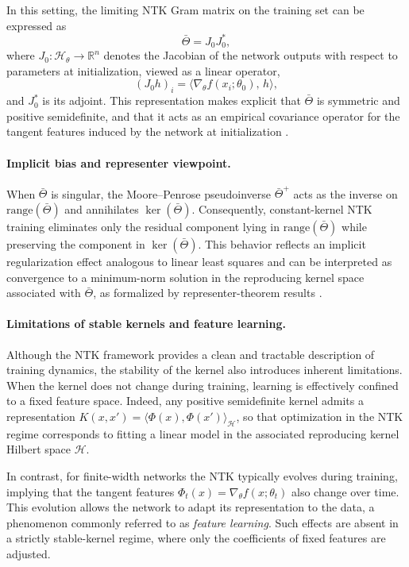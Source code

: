 In this setting, the limiting NTK Gram matrix on the training set can be
expressed as
\begin{equation}
	\bar\Theta = J_0 J_0^\ast,
\end{equation}
where $J_0 : \mathcal{H}_\theta \to \mathbb{R}^n$ denotes the Jacobian of the
network outputs with respect to parameters at initialization, viewed as a
linear operator,
\[
	(J_0 h)_i = \langle \nabla_\theta f(x_i;\theta_0),\,h\rangle,
\]
and $J_0^\ast$ is its adjoint. This representation makes explicit that
$\bar\Theta$ is symmetric and positive semidefinite, and that it acts as an
empirical covariance operator for the tangent features induced by the network
at initialization \citep{jacot2018ntk}.

\paragraph{Implicit bias and representer viewpoint.}
When $\bar\Theta$ is singular, the Moore--Penrose pseudoinverse $\bar\Theta^+$
acts as the inverse on $\mathrm{range}(\bar\Theta)$ and annihilates
$\ker(\bar\Theta)$. Consequently, constant-kernel NTK training eliminates only
the residual component lying in $\mathrm{range}(\bar\Theta)$ while preserving
the component in $\ker(\bar\Theta)$. This behavior reflects an implicit
regularization effect analogous to linear least squares and can be interpreted
as convergence to a minimum-norm solution in the reproducing kernel space
associated with $\bar\Theta$, as formalized by representer-theorem results
\citep{bietti2019inductivebiasneuraltangent,
	bartolucci2021understandingneuralnetworksreproducing}.

\paragraph{Limitations of stable kernels and feature learning.}
Although the NTK framework provides a clean and tractable description of
training dynamics, the stability of the kernel also introduces inherent
limitations. When the kernel does not change during training, learning is
effectively confined to a fixed feature space. Indeed, any positive
semidefinite kernel admits a representation
$K(x,x')=\langle \Phi(x),\Phi(x')\rangle_{\mathcal H}$, so that optimization in
the NTK regime corresponds to fitting a linear model in the associated
reproducing kernel Hilbert space $\mathcal H$.

In contrast, for finite-width networks the NTK typically evolves during
training, implying that the tangent features
$\Phi_t(x)=\nabla_\theta f(x;\theta_t)$ also change over time. This evolution
allows the network to adapt its representation to the data, a phenomenon
commonly referred to as \emph{feature learning}. Such effects are absent in a
strictly stable-kernel regime, where only the coefficients of fixed features
are adjusted.

